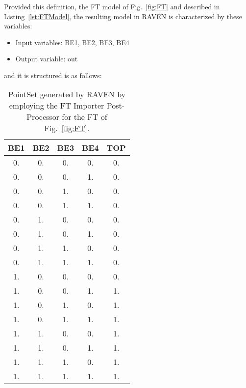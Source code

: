 Provided this definition, the FT model of Fig.~\ref{fig:FT} and described in Listing~\ref{lst:FTModel}, 
the resulting model in RAVEN is characterized by these variables:
\begin{itemize}
	\item Input variables: BE1, BE2, BE3, BE4
	\item Output variable: out
\end{itemize}
and it is structured is as follows:

\begin{table}
    \centering
    \caption{PointSet generated by RAVEN by employing the FT Importer Post-Processor for the FT of Fig.~\ref{fig:FT}.}
	\begin{tabular}{c | c | c | c | c} 
		\hline 
		BE1 & BE2 & BE3 & BE4 & TOP \\ 
		\hline 
		 0. &  0. &  0. &  0. &  0. \\
		 0. &  0. &  0. &  1. &  0. \\
		 0. &  0. &  1. &  0. &  0. \\
		 0. &  0. &  1. &  1. &  0. \\
		 0. &  1. &  0. &  0. &  0. \\
		 0. &  1. &  0. &  1. &  0. \\
		 0. &  1. &  1. &  0. &  0. \\
		 0. &  1. &  1. &  1. &  0. \\
		 1. &  0. &  0. &  0. &  0. \\
		 1. &  0. &  0. &  1. &  1. \\
		 1. &  0. &  1. &  0. &  1. \\
		 1. &  0. &  1. &  1. &  1. \\
		 1. &  1. &  0. &  0. &  1. \\
		 1. &  1. &  0. &  1. &  1. \\
		 1. &  1. &  1. &  0. &  1. \\
		 1. &  1. &  1. &  1. &  1. \\
		\hline 
	\end{tabular}
\end{table}

